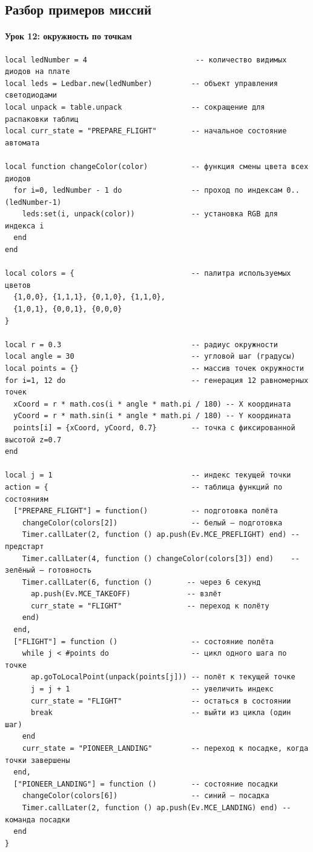\subsection{Разбор примеров миссий}
\paragraph{Урок 12: окружность по точкам}
\begin{verbatim}
local ledNumber = 4                         -- количество видимых диодов на плате
local leds = Ledbar.new(ledNumber)         -- объект управления светодиодами
local unpack = table.unpack                -- сокращение для распаковки таблиц
local curr_state = "PREPARE_FLIGHT"        -- начальное состояние автомата

local function changeColor(color)          -- функция смены цвета всех диодов
  for i=0, ledNumber - 1 do                -- проход по индексам 0..(ledNumber-1)
    leds:set(i, unpack(color))             -- установка RGB для индекса i
  end
end

local colors = {                           -- палитра используемых цветов
  {1,0,0}, {1,1,1}, {0,1,0}, {1,1,0},
  {1,0,1}, {0,0,1}, {0,0,0}
}

local r = 0.3                              -- радиус окружности
local angle = 30                           -- угловой шаг (градусы)
local points = {}                          -- массив точек окружности
for i=1, 12 do                             -- генерация 12 равномерных точек
  xCoord = r * math.cos(i * angle * math.pi / 180) -- X координата
  yCoord = r * math.sin(i * angle * math.pi / 180) -- Y координата
  points[i] = {xCoord, yCoord, 0.7}        -- точка с фиксированной высотой z=0.7
end

local j = 1                                -- индекс текущей точки
action = {                                 -- таблица функций по состояниям
  ["PREPARE_FLIGHT"] = function()          -- подготовка полёта
    changeColor(colors[2])                 -- белый — подготовка
    Timer.callLater(2, function () ap.push(Ev.MCE_PREFLIGHT) end) -- предстарт
    Timer.callLater(4, function () changeColor(colors[3]) end)    -- зелёный — готовность
    Timer.callLater(6, function ()        -- через 6 секунд
      ap.push(Ev.MCE_TAKEOFF)             -- взлёт
      curr_state = "FLIGHT"               -- переход к полёту
    end)
  end,
  ["FLIGHT"] = function ()                 -- состояние полёта
    while j < #points do                   -- цикл одного шага по точке
      ap.goToLocalPoint(unpack(points[j])) -- полёт к текущей точке
      j = j + 1                            -- увеличить индекс
      curr_state = "FLIGHT"                -- остаться в состоянии
      break                                -- выйти из цикла (один шаг)
    end
    curr_state = "PIONEER_LANDING"         -- переход к посадке, когда точки завершены
  end,
  ["PIONEER_LANDING"] = function ()        -- состояние посадки
    changeColor(colors[6])                 -- синий — посадка
    Timer.callLater(2, function () ap.push(Ev.MCE_LANDING) end) -- команда посадки
  end
}


\end{verbatim}
